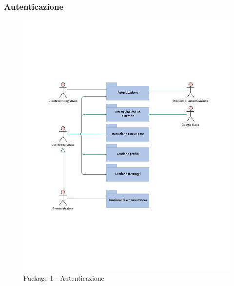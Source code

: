 \documentclass{natourDoc}
\begin{document}
\subsubsection{Autenticazione}
\begin{figure}[!htbp]
	\centering
	\includegraphics[width=\textwidth, page=2]{./diagrams/useCase.pdf}
	\caption{Package 1 - Autenticazione}
\end{figure}
\FloatBarrier

\newpage
\end{document}
